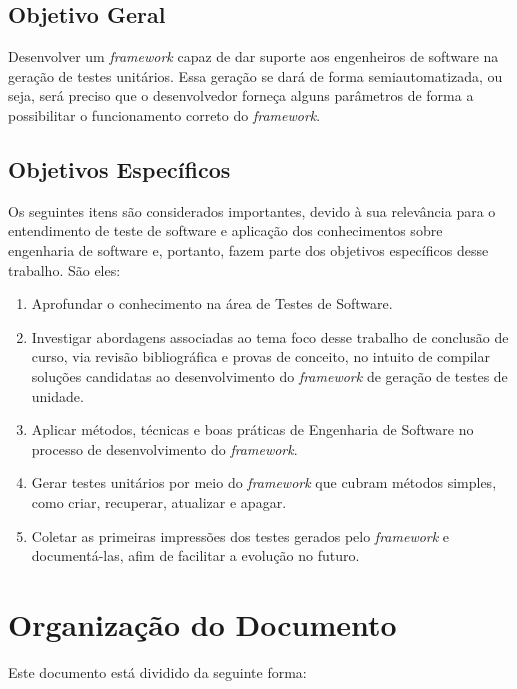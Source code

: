     \subsection{Objetivo Geral}
    Desenvolver um \textit{framework} capaz de dar suporte aos engenheiros de software na geração de testes unitários.  Essa geração se dará de forma semiautomatizada, ou seja, será preciso que o desenvolvedor forneça alguns parâmetros de forma a possibilitar o funcionamento correto do \textit{framework}.
    
    \subsection{Objetivos Específicos}
    Os seguintes itens são considerados importantes, devido à sua relevância para o entendimento de teste de software e aplicação dos conhecimentos sobre engenharia de software e, portanto, fazem parte dos objetivos específicos desse trabalho. São eles:

    \begin{enumerate}
      \item Aprofundar o conhecimento na área de Testes de Software.
      
      \item Investigar abordagens associadas ao tema foco desse trabalho de conclusão de curso, via revisão bibliográfica e provas de conceito, no intuito de compilar soluções candidatas ao desenvolvimento do \textit{framework} de geração de testes de unidade.
      
      \item Aplicar métodos, técnicas e boas práticas de Engenharia de Software no processo de desenvolvimento do \textit{framework}.
      
      \item Gerar testes unitários por meio do \textit{framework} que cubram métodos simples, como criar, recuperar, atualizar e apagar.

      \item Coletar as primeiras impressões dos testes gerados pelo \textit{framework} e documentá-las, afim de facilitar a evolução no futuro.

    \end{enumerate}
    
\section{Organização do Documento}
	Este documento está dividido da seguinte forma:
	
